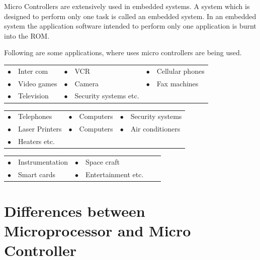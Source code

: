 Micro Controllers are extensively used in embedded systems. A system which is designed to perform only one task is called an embedded system. In an embedded system the application software intended to perform only one application is burnt into the ROM.

Following are some applications, where uses micro controllers are being used.

\smallskip
{}
\begin{center}
\begin{tabular}{l@{\;\,}l@{\qquad}l@{\;\,}l@{\qquad}l@{\;\,}l}
$\bullet$ & Inter com & $\bullet$ & VCR & $\bullet$ & Cellular phones\\[4pt]
$\bullet$ & Video games &$\bullet$ & Camera & $\bullet$ & Fax machines\\[4pt]
$\bullet$ & Television & $\bullet$ & Security systems etc.
\end{tabular}
\end{center}

\begin{center}
\begin{tabular}{l@{\;\,}l@{\qquad}l@{\;\,}l@{\qquad}l@{\;\,}l}
$\bullet$ & Telephones & $\bullet$ & Computers & $\bullet$ & Security systems\\[4pt]
$\bullet$ & Laser Printers & $\bullet$ & Computers & $\bullet$ &
Air conditioners\\[4pt]
$\bullet$ & Heaters etc.
\end{tabular}
\end{center}

\begin{center}
\begin{tabular}{l@{\;\,}l@{\qquad}l@{\;\,}l@{\qquad}l@{\;\,}l}
$\bullet$ &  Instrumentation & $\bullet$ & Space craft\\[4pt]
$\bullet$ &  Smart cards & $\bullet$ & Entertainment etc.
\end{tabular}
\end{center}

\eject

\section{Differences between Microprocessor and Micro Controller}\label{sec7.16}

